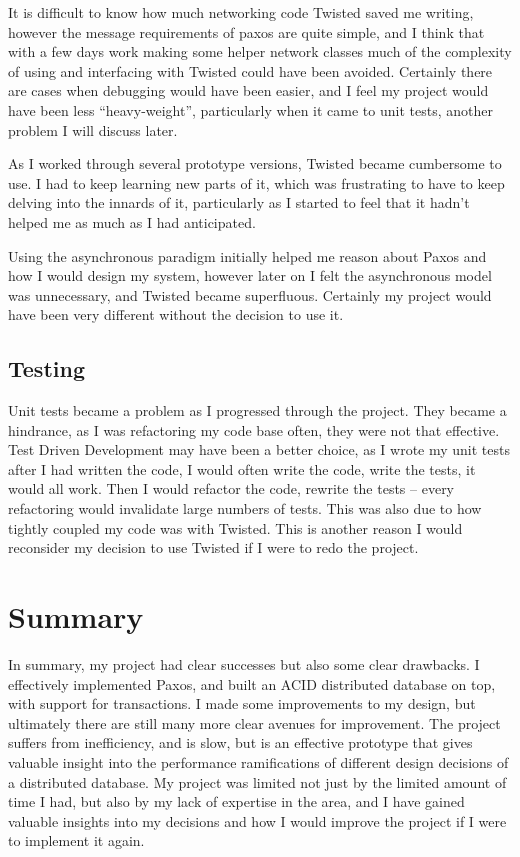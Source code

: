 \documentclass[12pt,twoside,notitlepage]{report}
\begin{document}
It is difficult to know how much networking code Twisted saved me writing, however
the message requirements of paxos are quite simple, and I think that with a few days work making
some helper network classes much of the complexity of using and interfacing with Twisted could
have been avoided. Certainly there are cases when debugging would have been easier, and I feel my
project would have been less ``heavy-weight'', particularly when it came to unit tests, another
problem I will discuss later.

As I worked through several prototype versions, Twisted became cumbersome to use. I had to keep
learning new parts of it, which was frustrating to have to keep delving into the innards of it,
particularly as I started to feel that it hadn't helped me as much as I had anticipated.

Using the asynchronous paradigm initially helped me reason about Paxos and how I would design my
system, however later on I felt the asynchronous model was unnecessary, and Twisted became
superfluous. Certainly my project would have been very different without the decision to use it.

\subsection*{Testing}

Unit tests became a problem as I progressed through the project.  They became a hindrance, as I
was refactoring my code base often, they were not that effective. Test Driven Development may have
been a better choice, as I wrote my unit tests after I had written the code, I would often write
the code, write the tests, it would all work. Then I would refactor the code, rewrite the tests --
every refactoring would invalidate large numbers of tests. This was also due to how tightly
coupled my code was with Twisted. This is another reason I would reconsider my decision to use
Twisted if I were to redo the project.

\section{Summary}

In summary, my project had clear successes but also some clear drawbacks. I effectively
implemented Paxos, and built an ACID distributed database on top, with support for transactions. I
made some improvements to my design, but ultimately there are still many more clear avenues for
improvement. The project suffers from inefficiency, and is slow, but is an effective prototype
that gives valuable insight into the performance ramifications of different design decisions of a
distributed database. My project was limited not just by the limited amount of time I had, but
also by my lack of expertise in the area, and I have gained valuable insights into my decisions
and how I would improve the project if I were to implement it again.
\end{document}
